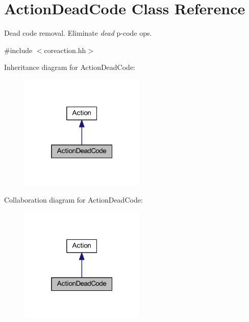 \hypertarget{class_action_dead_code}{}\section{Action\+Dead\+Code Class Reference}
\label{class_action_dead_code}


Dead code removal. Eliminate {\itshape dead} p-\/code ops.  




{\ttfamily \#include $<$coreaction.\+hh$>$}



Inheritance diagram for Action\+Dead\+Code\+:
\nopagebreak
\begin{figure}[H]
\begin{center}
\leavevmode
\includegraphics[width=169pt]{class_action_dead_code__inherit__graph}
\end{center}
\end{figure}


Collaboration diagram for Action\+Dead\+Code\+:
\nopagebreak
\begin{figure}[H]
\begin{center}
\leavevmode
\includegraphics[width=169pt]{class_action_dead_code__coll__graph}
\end{center}
\end{figure}
